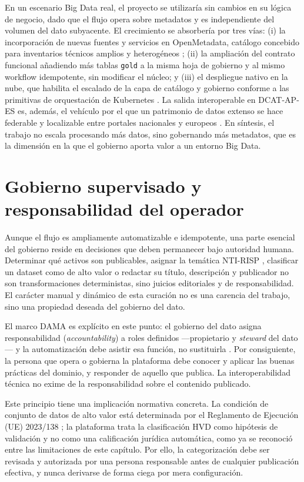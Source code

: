 En un escenario Big Data real, el proyecto se utilizaría sin cambios en su lógica de negocio, dado que el flujo opera sobre metadatos y es independiente del volumen del dato subyacente. El crecimiento se absorbería por tres vías: (i) la incorporación de nuevas fuentes y servicios en OpenMetadata, catálogo concebido para inventarios técnicos amplios y heterogéneos \cite{openmetadataDocs}; (ii) la ampliación del contrato funcional añadiendo más tablas \texttt{gold} a la misma hoja de gobierno y al mismo workflow idempotente, sin modificar el núcleo; y (iii) el despliegue nativo en la nube, que habilita el escalado de la capa de catálogo y gobierno conforme a las primitivas de orquestación de Kubernetes \cite{kubernetesConcepts}. La salida interoperable en DCAT-AP-ES es, además, el vehículo por el que un patrimonio de datos extenso se hace federable y localizable entre portales nacionales y europeos \cite{datosGobDcatApEs2025,w3cDcat3}. En síntesis, el trabajo no escala procesando más datos, sino gobernando más metadatos, que es la dimensión en la que el gobierno aporta valor a un entorno Big Data.

\section{Gobierno supervisado y responsabilidad del operador}\label{sec:gobierno-supervisado}

Aunque el flujo es ampliamente automatizable e idempotente, una parte esencial del gobierno reside en decisiones que deben permanecer bajo autoridad humana. Determinar qué activos son publicables, asignar la temática NTI-RISP \cite{datosGobNtiRisp}, clasificar un dataset como de alto valor o redactar su título, descripción y publicador no son transformaciones deterministas, sino juicios editoriales y de responsabilidad. El carácter manual y dinámico de esta curación no es una carencia del trabajo, sino una propiedad deseada del gobierno del dato.

El marco DAMA es explícito en este punto: el gobierno del dato asigna responsabilidad (\emph{accountability}) a roles definidos —propietario y \emph{steward} del dato— y la automatización debe asistir esa función, no sustituirla \cite{damaDmbok,datosGobDama2021}. Por consiguiente, la persona que opera o gobierna la plataforma debe conocer y aplicar las buenas prácticas del dominio, y responder de aquello que publica. La interoperabilidad técnica no exime de la responsabilidad sobre el contenido publicado.

Este principio tiene una implicación normativa concreta. La condición de conjunto de datos de alto valor está determinada por el Reglamento de Ejecución (UE) 2023/138 \cite{euHvdRegulation}; la plataforma trata la clasificación HVD como hipótesis de validación y no como una calificación jurídica automática, como ya se reconoció entre las limitaciones de este capítulo. Por ello, la categorización debe ser revisada y autorizada por una persona responsable antes de cualquier publicación efectiva, y nunca derivarse de forma ciega por mera configuración.

